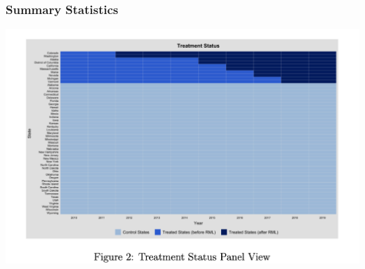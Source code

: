 \documentclass{beamer}
\begin{document}
\begin{frame} %
\frametitle{Summary Statistics}

	\includegraphics[scale = 0.33]{panel}

\end{frame}
\end{document}
